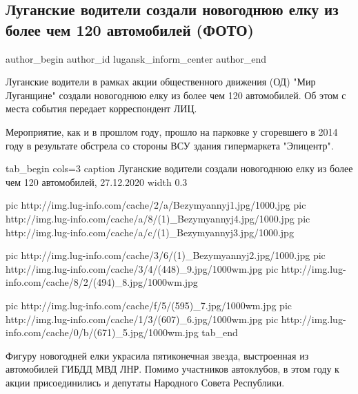  
 
 
 
 
 
\subsection{Луганские водители создали новогоднюю елку из более чем 120 автомобилей (ФОТО)}
\label{sec:27_12_2020.news.lnr.lug_info.lugansk_inform_center.1.elka_avto}
\ifcmt
	author_begin
   author_id lugansk_inform_center
	author_end
\fi


Луганские водители в рамках акции общественного движения (ОД) "Мир
Луганщине" создали новогоднюю елку из более чем 120 автомобилей. Об этом с
места события передает корреспондент ЛИЦ.

Мероприятие, как и в прошлом году, прошло на парковке у сгоревшего в 2014
году в результате обстрела со стороны ВСУ здания гипермаркета "Эпицентр".


\ifcmt
tab_begin cols=3
	caption Луганские водители создали новогоднюю елку из более чем 120 автомобилей, 27.12.2020
	width 0.3

  pic http://img.lug-info.com/cache/2/a/Bezymyannyj1.jpg/1000.jpg
	pic http://img.lug-info.com/cache/a/8/(1)_Bezymyannyj4.jpg/1000.jpg
	pic http://img.lug-info.com/cache/a/c/(1)_Bezymyannyj3.jpg/1000.jpg

	pic http://img.lug-info.com/cache/3/6/(1)_Bezymyannyj2.jpg/1000.jpg
	pic http://img.lug-info.com/cache/3/4/(448)_9.jpg/1000wm.jpg
	pic http://img.lug-info.com/cache/8/2/(494)_8.jpg/1000wm.jpg

	pic http://img.lug-info.com/cache/f/5/(595)_7.jpg/1000wm.jpg
	pic http://img.lug-info.com/cache/1/3/(607)_6.jpg/1000wm.jpg
	pic http://img.lug-info.com/cache/0/b/(671)_5.jpg/1000wm.jpg
tab_end
\fi


Фигуру новогодней елки украсила пятиконечная звезда, выстроенная из
автомобилей ГИБДД МВД ЛНР. Помимо участников автоклубов, в этом году к
акции присоединились и депутаты Народного Совета Республики.

